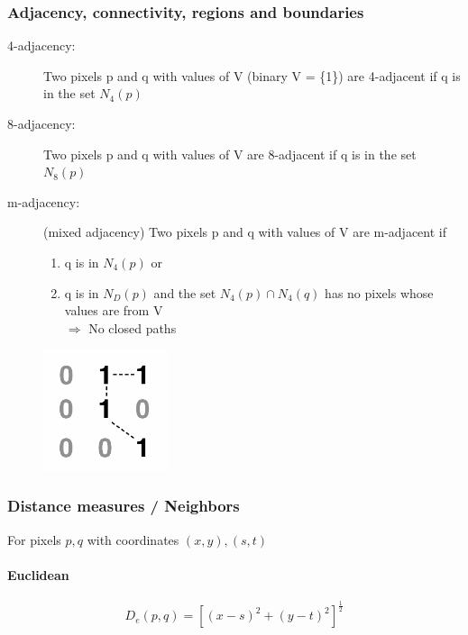 \subsubsection{Adjacency, connectivity, regions and boundaries }
\begin{description}
  \item[4-adjacency:] Two pixels p and q with values of V (binary V = \{1\}) are 4-adjacent if q is in the set $N_4(p)$
  \item[8-adjacency:] Two pixels p and q with values of V are 8-adjacent if q is in the set $N_8(p)$
  \item[m-adjacency:] (mixed adjacency) Two pixels p and q with values of V are m-adjacent if\\
    \begin{minipage}{0.8\textwidth}
  	\begin{enumerate}
  		\item q is in $N_4(p)$ or
  		\item q is in $N_D(p)$ and the set $N_4(p) \cap N_4(q)$ has no pixels whose values are from V \\ $\Rightarrow$ No closed paths
	  \end{enumerate}
  \end{minipage}
  \begin{minipage}{0.3\textwidth}
    \includegraphics[width = 0.3\textwidth]{./images/m_adjacency}
  \end{minipage}
\end{description}

\subsubsection{Distance measures / Neighbors }
For pixels $p,q$  with coordinates $(x,y), (s,t)$
\paragraph{Euclidean}
\begin{equation}
D_e(p,q) = [(x-s)^2 + (y-t)^2]^{\frac{1}{2}}
\end{equation}
